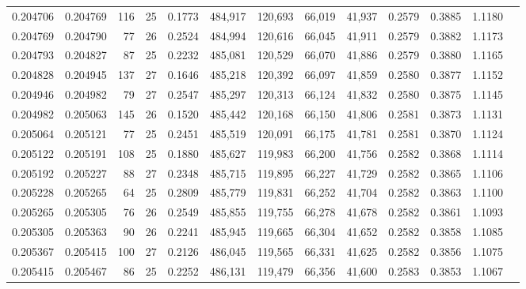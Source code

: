 \begin{tabular}{rrrrrrrrrrrrr}
0.204706 & 0.204769 & 116 &  25 &                                     0.1773 & 484,917 & 120,693 &  66,019 &  41,937 & 0.2579 & 0.3885 & 1.1180 \\
0.204769 & 0.204790 &  77 &  26 &                                     0.2524 & 484,994 & 120,616 &  66,045 &  41,911 & 0.2579 & 0.3882 & 1.1173 \\
0.204793 & 0.204827 &  87 &  25 &                                     0.2232 & 485,081 & 120,529 &  66,070 &  41,886 & 0.2579 & 0.3880 & 1.1165 \\
0.204828 & 0.204945 & 137 &  27 &                                     0.1646 & 485,218 & 120,392 &  66,097 &  41,859 & 0.2580 & 0.3877 & 1.1152 \\
0.204946 & 0.204982 &  79 &  27 &                                     0.2547 & 485,297 & 120,313 &  66,124 &  41,832 & 0.2580 & 0.3875 & 1.1145 \\
0.204982 & 0.205063 & 145 &  26 &                                     0.1520 & 485,442 & 120,168 &  66,150 &  41,806 & 0.2581 & 0.3873 & 1.1131 \\
0.205064 & 0.205121 &  77 &  25 &                                     0.2451 & 485,519 & 120,091 &  66,175 &  41,781 & 0.2581 & 0.3870 & 1.1124 \\
0.205122 & 0.205191 & 108 &  25 &                                     0.1880 & 485,627 & 119,983 &  66,200 &  41,756 & 0.2582 & 0.3868 & 1.1114 \\
0.205192 & 0.205227 &  88 &  27 &                                     0.2348 & 485,715 & 119,895 &  66,227 &  41,729 & 0.2582 & 0.3865 & 1.1106 \\
0.205228 & 0.205265 &  64 &  25 &                                     0.2809 & 485,779 & 119,831 &  66,252 &  41,704 & 0.2582 & 0.3863 & 1.1100 \\
0.205265 & 0.205305 &  76 &  26 &                                     0.2549 & 485,855 & 119,755 &  66,278 &  41,678 & 0.2582 & 0.3861 & 1.1093 \\
0.205305 & 0.205363 &  90 &  26 &                                     0.2241 & 485,945 & 119,665 &  66,304 &  41,652 & 0.2582 & 0.3858 & 1.1085 \\
0.205367 & 0.205415 & 100 &  27 &                                     0.2126 & 486,045 & 119,565 &  66,331 &  41,625 & 0.2582 & 0.3856 & 1.1075 \\
0.205415 & 0.205467 &  86 &  25 &                                     0.2252 & 486,131 & 119,479 &  66,356 &  41,600 & 0.2583 & 0.3853 & 1.1067 \\

\end{tabular}
